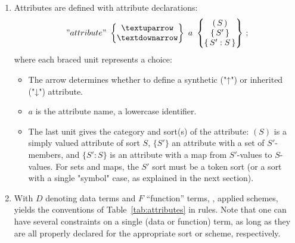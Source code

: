 \documentclass[11pt]{article} %
\begin{document}
\begin{notation}[attributes]\leavevmode
  \begin{enumerate}

  \item Attributes are defined with attribute declarations:
    \begin{displaymath}
      "attribute"
      ~
      \left\{
      \begin{matrix}
        {↑} \\
        {↓}
      \end{matrix}
      \right\}
      ~
      a
      ~
      \left\{
      \begin{matrix}
        (\,S\,) \\
        \{\,S'\,\} \\
        \{\,S' : S\,\}
      \end{matrix}
      \right\}
      \,;
    \end{displaymath}
    where each braced unit represents a choice:
    \begin{itemize}
    \item The arrow determines whether to define a synthetic ("↑") or inherited ("↓") attribute.
    \item $a$ is the attribute name, a lowercase identifier.
    \item The last unit gives the category and sort(s) of the attribute: $(S)$ is a simply valued
      attribute of sort $S$, $\{S'\}$ an attribute with a set of $S'$-members, and $\{S':S\}$ is an
      attribute with a map from $S'$-values to $S$-values. For sets and maps, the $S'$ sort must be
      a token sort (or a sort with a single "symbol" case, as explained in the next section).
    \end{itemize}

  \item With $D$ denoting data terms and $F$ ``function'' terms, \ie, applied schemes, yields the
    conventions of Table~\ref{tab:attributes} in \HAX rules.  Note that one can have several
    constraints on a single (data or function) term, as long as they are all properly declared for
    the appropriate sort or scheme, respectively.

  \end{enumerate}
\end{notation}
\end{document}
